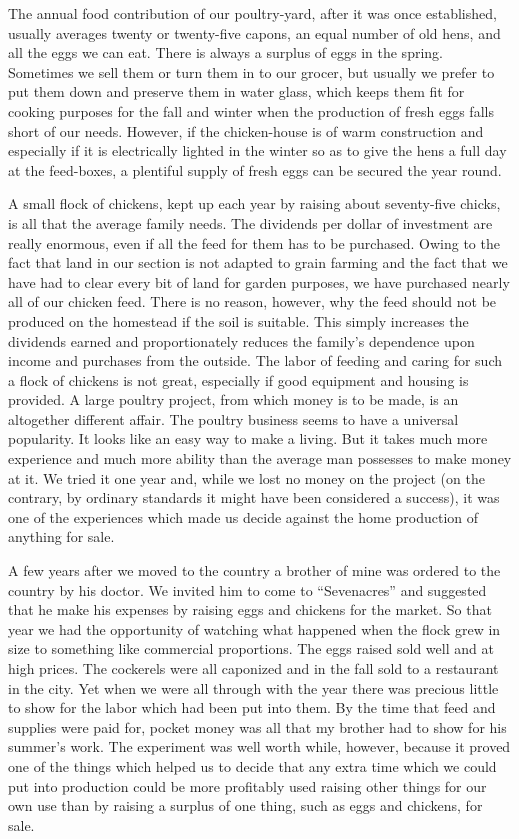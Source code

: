 \documentclass{book}
\begin{document}
The annual food contribution of our poultry-yard, after it was once established, usually averages twenty or twenty-five capons, an equal number of old hens, and all the eggs we can eat. There is always a surplus of eggs in the spring. Sometimes we sell them or turn them in to our grocer, but usually we prefer to put them down and preserve them in water glass, which keeps them fit for cooking purposes for the fall and winter when the production of fresh eggs falls short of our needs. However, if the chicken-house is of warm construction and especially if it is electrically lighted in the winter so as to give the hens a full day at the feed-boxes, a plentiful supply of fresh eggs can be secured the year round.

A small flock of chickens, kept up each year by raising about seventy-five chicks, is all that the average family needs. The dividends per dollar of investment are really enormous, even if all the feed for them has to be purchased. Owing to the fact that land in our section is not adapted to grain farming and the fact that we have had to clear every bit of land for garden purposes, we have purchased nearly all of our chicken feed. There is no reason, however, why the feed should not be produced on the homestead if the soil is suitable. This simply increases the dividends earned and proportionately reduces the family’s dependence upon income and purchases from the outside. The labor of feeding and caring for such a flock of chickens is not great, especially if good equipment and housing is provided. A large poultry project, from which money is to be made, is an altogether different affair. The poultry business seems to have a universal popularity. It looks like an easy way to make a living. But it takes much more experience and much more ability than the average man possesses to make money at it. We tried it one year and, while we lost no money on the project (on the contrary, by ordinary standards it might have been considered a success), it was one of the experiences which made us decide against the home production of anything for sale.

A few years after we moved to the country a brother of mine was ordered to the country by his doctor. We invited him to come to “Sevenacres” and suggested that he make his expenses by raising eggs and chickens for the market. So that year we had the opportunity of watching what happened when the flock grew in size to something like commercial proportions. The eggs raised sold well and at high prices. The cockerels were all caponized and in the fall sold to a restaurant in the city. Yet when we were all through with the year there was precious little to show for the labor which had been put into them. By the time that feed and supplies were paid for, pocket money was all that my brother had to show for his summer’s work. The experiment was well worth while, however, because it proved one of the things which helped us to decide that any extra time which we could put into production could be more profitably used raising other things for our own use than by raising a surplus of one thing, such as eggs and chickens, for sale.
\end{document}
